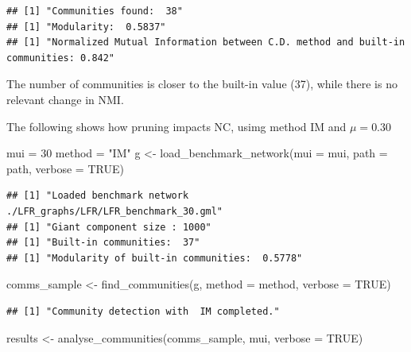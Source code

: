 \documentclass[
]{article}
\newenvironment{Shaded}{\begin{snugshade}}{\end{snugshade}}
\newcommand{\AttributeTok}[1]{\textcolor[rgb]{0.77,0.63,0.00}{#1}}
\newcommand{\ConstantTok}[1]{\textcolor[rgb]{0.00,0.00,0.00}{#1}}
\newcommand{\DecValTok}[1]{\textcolor[rgb]{0.00,0.00,0.81}{#1}}
\newcommand{\FunctionTok}[1]{\textcolor[rgb]{0.00,0.00,0.00}{#1}}
\newcommand{\NormalTok}[1]{#1}
\newcommand{\OtherTok}[1]{\textcolor[rgb]{0.56,0.35,0.01}{#1}}
\newcommand{\StringTok}[1]{\textcolor[rgb]{0.31,0.60,0.02}{#1}}
\begin{document}
\begin{verbatim}
## [1] "Communities found:  38"
## [1] "Modularity:  0.5837"
## [1] "Normalized Mutual Information between C.D. method and built-in communities: 0.842"
\end{verbatim}

The number of communities is closer to the built-in value (37), while
there is no relevant change in NMI.

The following shows how pruning impacts NC, usimg method IM and
\(\mu = 0.30\)

\begin{Shaded}
\begin{Highlighting}[]
\NormalTok{mui }\OtherTok{=} \DecValTok{30}
\NormalTok{method }\OtherTok{=} \StringTok{"IM"}
\NormalTok{g }\OtherTok{\textless{}{-}} \FunctionTok{load\_benchmark\_network}\NormalTok{(}\AttributeTok{mui =}\NormalTok{ mui, }\AttributeTok{path =}\NormalTok{ path, }\AttributeTok{verbose =} \ConstantTok{TRUE}\NormalTok{)}
\end{Highlighting}
\end{Shaded}

\begin{verbatim}
## [1] "Loaded benchmark network ./LFR_graphs/LFR/LFR_benchmark_30.gml"
## [1] "Giant component size : 1000"
## [1] "Built-in communities:  37"
## [1] "Modularity of built-in communities:  0.5778"
\end{verbatim}

\begin{Shaded}
\begin{Highlighting}[]
\NormalTok{comms\_sample }\OtherTok{\textless{}{-}} \FunctionTok{find\_communities}\NormalTok{(g, }\AttributeTok{method =}\NormalTok{ method, }\AttributeTok{verbose =} \ConstantTok{TRUE}\NormalTok{)}
\end{Highlighting}
\end{Shaded}

\begin{verbatim}
## [1] "Community detection with  IM completed."
\end{verbatim}

\begin{Shaded}
\begin{Highlighting}[]
\NormalTok{results }\OtherTok{\textless{}{-}} \FunctionTok{analyse\_communities}\NormalTok{(comms\_sample, mui, }\AttributeTok{verbose =} \ConstantTok{TRUE}\NormalTok{)}
\end{Highlighting}
\end{Shaded}
\end{document}

